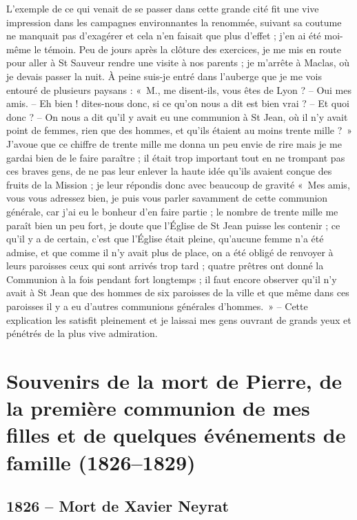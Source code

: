 \documentclass[11pt,a4paper]{report}
\begin{document}
L'exemple de ce qui venait de se passer dans cette grande cité fit une vive impression dans les campagnes environnantes la renommée, suivant sa coutume ne manquait pas d'exagérer et cela n'en faisait que plus d'effet ; j'en ai été moi-même le témoin. Peu de jours après la clôture des exercices, je me mis en route pour aller à St Sauveur rendre une visite à nos parents ; je m'arrête à Maclas, où je devais passer la nuit. À peine suis-je entré dans l'auberge que je me vois entouré de plusieurs paysans : «~M., me disent-ils, vous êtes de Lyon ? -- Oui mes amis. -- Eh bien ! dites-nous donc, si ce qu'on nous a dit est bien vrai ? -- Et quoi donc ? -- On nous a dit qu'il y avait eu une communion à St Jean, où il n'y avait point de femmes, rien que des hommes, et qu'ils étaient au moins trente mille ?~» J'avoue que ce chiffre de trente mille me donna un peu envie de rire mais je me gardai bien de le faire paraître ; il était trop important tout en ne trompant pas ces braves gens, de ne pas leur enlever la haute idée qu'ils avaient conçue des fruits de la Mission ; je leur répondis donc avec beaucoup de gravité «~Mes amis, vous vous adressez bien, je puis vous parler savamment de cette communion générale, car j'ai eu le bonheur d'en faire partie ; le nombre de trente mille me paraît bien un peu fort, je doute que l'Église de St Jean puisse les contenir ; ce qu'il y a de certain, c'est que l'Église était pleine, qu'aucune femme n'a été admise, et que comme il n'y avait plus de place, on a été obligé de renvoyer à leurs paroisses ceux qui sont arrivés trop tard ; quatre prêtres ont donné la Communion à la fois pendant fort longtemps ; il faut encore observer qu'il n'y avait à St Jean que des hommes de six paroisses de la ville et que même dans ces paroisses il y a eu d'autres communions générales d'hommes.~» -- Cette explication les satisfit pleinement et je laissai mes gens ouvrant de grands yeux et pénétrés de la plus vive admiration.


\chapter{Souvenirs de la mort de Pierre, de la première communion de mes filles et de quelques événements de famille (1826--1829)}

\section*{1826 -- Mort de Xavier Neyrat}
\end{document}
